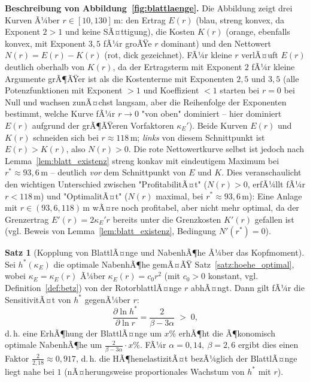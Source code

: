 ﻿\documentclass[a4paper,12pt]{article}
\theoremstyle{definition}
\newtheorem{satz}{Satz}
\begin{document}
\textbf{Beschreibung von Abbildung~\ref{fig:blattlaenge}.}
Die Abbildung zeigt drei Kurven Ã¼ber $r\in[10,130]\,\mathrm{m}$: den Ertrag $E(r)$ (blau, streng konvex, da Exponent $2>1$ und keine SÃ¤ttigung), die Kosten $K(r)$ (orange, ebenfalls konvex, mit Exponent $3{,}5$ fÃ¼r groÃŸe $r$ dominant) und den Nettowert $N(r)=E(r)-K(r)$ (rot, dick gezeichnet). FÃ¼r kleine $r$ verlÃ¤uft $E(r)$ deutlich oberhalb von $K(r)$, da der Ertragsterm mit Exponent $2$ fÃ¼r kleine Argumente grÃ¶ÃŸer ist als die Kostenterme mit Exponenten $2{,}5$ und $3{,}5$ (alle Potenzfunktionen mit Exponent $>1$ und Koeffizient $<1$ starten bei $r=0$ bei Null und wachsen zunÃ¤chst langsam, aber die Reihenfolge der Exponenten bestimmt, welche Kurve fÃ¼r $r\to0$ "von oben" dominiert -- hier dominiert $E(r)$ aufgrund der grÃ¶ÃŸeren Vorfaktoren $\kappa_E'$). Beide Kurven $E(r)$ und $K(r)$ schneiden sich bei $r\approx118\,\mathrm{m}$; \emph{links} von diesem Schnittpunkt ist $E(r)>K(r)$, also $N(r)>0$. Die rote Nettowertkurve selbst ist jedoch nach Lemma~\ref{lem:blatt_existenz} streng konkav mit eindeutigem Maximum bei $r^*\approx93{,}6\,\mathrm{m}$ -- deutlich \emph{vor} dem Schnittpunkt von $E$ und $K$. Dies veranschaulicht den wichtigen Unterschied zwischen "ProfitabilitÃ¤t" ($N(r)>0$, erfÃ¼llt fÃ¼r $r<118\,\mathrm{m}$) und "OptimalitÃ¤t" ($N(r)$ maximal, bei $r^*\approx93{,}6\,\mathrm{m}$): Eine Anlage mit $r\in(93{,}6, 118)\,\mathrm{m}$ wÃ¤re noch profitabel, aber nicht mehr optimal, da der Grenzertrag $E'(r)=2\kappa_E'r$ bereits unter die Grenzkosten $K'(r)$ gefallen ist (vgl. Beweis von Lemma~\ref{lem:blatt_existenz}, Bedingung $N'(r^*)=0$).

\begin{satz}[Kopplung von BlattlÃ¤nge und NabenhÃ¶he Ã¼ber das Kopfmoment]
\label{satz:kopplung_rh}
Sei $h^*(\kappa_E)$ die optimale NabenhÃ¶he gemÃ¤ÃŸ Satz~\ref{satz:hoehe_optimal}, wobei $\kappa_E = \kappa_E(r)$ Ã¼ber $\kappa_E(r) = c_0 r^2$ (mit $c_0>0$ konstant, vgl. Definition~\ref{def:betz}) von der RotorblattlÃ¤nge $r$ abhÃ¤ngt. Dann gilt fÃ¼r die SensitivitÃ¤t von $h^*$ gegenÃ¼ber $r$:
\[
\frac{\partial \ln h^*}{\partial \ln r} = \frac{2}{\beta-3\alpha} \;>\; 0,
\]
d.\,h. eine ErhÃ¶hung der BlattlÃ¤nge um $x\%$ erhÃ¶ht die Ã¶konomisch optimale NabenhÃ¶he um $\frac{2}{\beta-3\alpha}\cdot x\%$. FÃ¼r $\alpha=0{,}14,\ \beta=2{,}6$ ergibt dies einen Faktor $\frac{2}{2{,}18}\approx0{,}917$, d.\,h. die HÃ¶henelastizitÃ¤t bezÃ¼glich der BlattlÃ¤nge liegt nahe bei $1$ (nÃ¤herungsweise proportionales Wachstum von $h^*$ mit $r$).
\end{satz}
\end{document}

